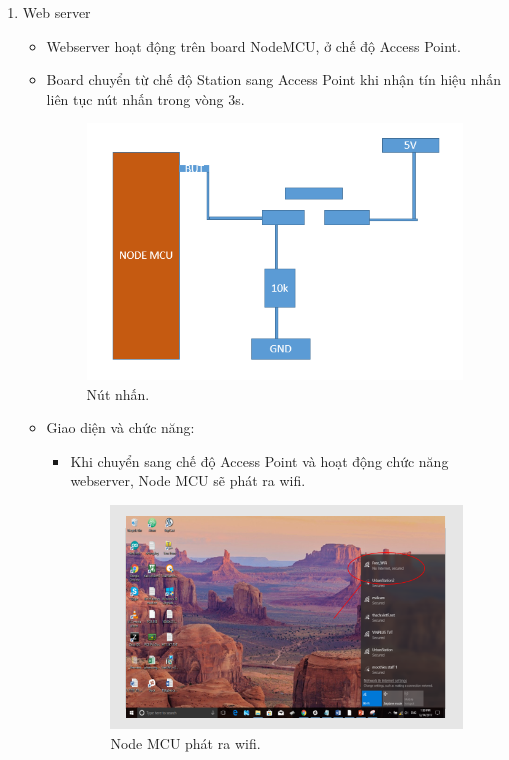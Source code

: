 \documentclass[a4paper,12pt,oneside]{article}
\begin{document}
\begin{enumerate}
	\item Web server
	\begin{itemize}
		\item Webserver hoạt động trên board NodeMCU, ở chế độ Access Point.
		\item Board chuyển từ chế độ Station sang Access Point khi nhận tín hiệu nhấn liên tục nút nhấn trong vòng 3s.
			\begin{figure}[H]
			\centering
			\includegraphics[scale=.9]{hinh/node_button.PNG}
			\caption{Nút nhấn.}
			\end{figure}
		\item Giao diện và chức năng:
		\begin{itemize}
			\item Khi chuyển sang chế độ Access Point và hoạt động chức năng webserver, Node MCU sẽ phát ra wifi.
			\begin{figure}[H]
			\centering
			\includegraphics[scale=.9]{hinh/webserver_1.PNG}
			\caption{Node MCU phát ra wifi.}
			\end{figure}
			

\end{itemize}
\end{itemize}
\end{enumerate}
\end{document}
